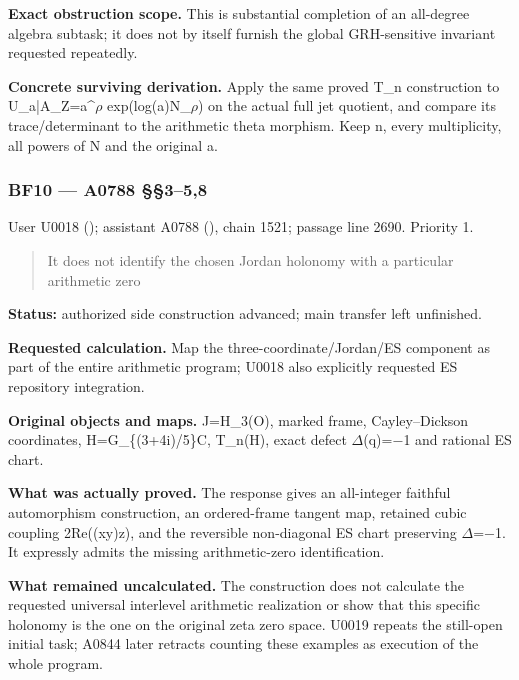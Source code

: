 \textbf{Exact obstruction scope.} This is substantial completion of an
all-degree algebra subtask; it does not by itself furnish the global
GRH-sensitive invariant requested repeatedly.

\textbf{Concrete surviving derivation.} Apply the same proved T\_n
construction to
U\_a|A\_Z=a\textasciicircum{}\allowbreak{}\ensuremath{ρ}\allowbreak{}
exp(log(a)N\_\allowbreak{}\ensuremath{ρ}\allowbreak{}) on the actual
full jet quotient, and compare its trace/determinant to the arithmetic
theta morphism. Keep n, every multiplicity, all powers of N and the
original a.

\subsubsection{BF10 --- A0788 §§3--5,8}\label{TranscriptLedgerStage:bf10-a0788-358}

User U0018 (\protect{});
assistant A0788 (\protect{}),
chain 1521; passage line 2690. Priority 1.

\begin{quote}
It does not identify the chosen Jordan holonomy with a particular
arithmetic zero
\end{quote}

\textbf{Status:} authorized side construction advanced; main transfer
left unfinished.

\textbf{Requested calculation.} Map the three-coordinate/Jordan/ES
component as part of the entire arithmetic program; U0018 also
explicitly requested ES repository integration.

\textbf{Original objects and maps.} J=H\_3(O), marked frame,
Cayley--Dickson coordinates, H=G\_\{(3+4i)/5\}C, T\_n(H), exact defect
\allowbreak{}\ensuremath{Δ}\allowbreak{}(q)=\allowbreak{}\ensuremath{−}\allowbreak{}1
and rational ES chart.

\textbf{What was actually proved.} The response gives an all-integer
faithful automorphism construction, an ordered-frame tangent map,
retained cubic coupling 2Re((xy)z), and the reversible non-diagonal ES
chart preserving
\allowbreak{}\ensuremath{Δ}\allowbreak{}=\allowbreak{}\ensuremath{−}\allowbreak{}1.
It expressly admits the missing arithmetic-zero identification.

\textbf{What remained uncalculated.} The construction does not calculate
the requested universal interlevel arithmetic realization or show that
this specific holonomy is the one on the original zeta zero space. U0019
repeats the still-open initial task; A0844 later retracts counting these
examples as execution of the whole program.


